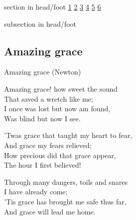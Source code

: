 \documentclass{beamer}
\begin{document}
{
{ 
 {
 \begin{beamercolorbox}[ht=4.5ex,dp=1.5ex,%
      leftskip=.3cm,rightskip=.3cm plus1fil]{section in head/foot}
 \fontsize{12}{25}\selectfont 
\hyperlink{Amazing grace[](Newton)1}{1}
\hyperlink{Amazing grace[](Newton)2}{2}
\hyperlink{Amazing grace[](Newton)3}{3}
\hyperlink{Amazing grace[](Newton)4}{4}
\hyperlink{Amazing grace[](Newton)5}{5}
\hyperlink{Amazing grace[](Newton)6}{6}
 
 \end{beamercolorbox}%
  \begin{beamercolorbox}[ht=2.5ex,dp=1.125ex,%
   leftskip=.3cm,rightskip=.3cm plus1fil]{subsection in head/foot}
   \insertauthor
 \end{beamercolorbox}%
 }
}
\subsection{ Amazing grace }

\hypertarget{Amazing grace[](Newton)1}{}
\begin{frame}{Amazing grace (Newton)}
\fontsize{ 18 }{ 23 }\selectfont

Amazing grace! how sweet the sound\\ 
That saved a wretch like me;\\ 
I once was lost but now am found,\\ 
Was blind but now I see. 

\end{frame}

\hypertarget{Amazing grace[](Newton)2}{}
\begin{frame}{}
\fontsize{ 18 }{ 23 }\selectfont

'Twas grace that taught my heart to fear,\\ 
And grace my fears relieved;\\ 
How precious did that grace appear,\\ 
The hour I first believed! 

\end{frame}

\hypertarget{Amazing grace[](Newton)3}{}
\begin{frame}{}
\fontsize{ 18 }{ 23 }\selectfont

Through many dangers, toils and snares\\ 
I have already come;\\ 
'Tis grace has brought me safe thus far,\\ 
And grace will lead me home. 


\end{frame}}
\end{document}

